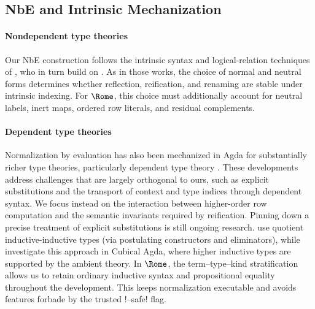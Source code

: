 \subsection{NbE and Intrinsic Mechanization}

\paragraph{Nondependent type theories}
Our NbE construction follows the intrinsic syntax and logical-relation techniques of , who in turn build on . As in those works, the choice of normal and neutral forms determines whether reflection, reification, and renaming are stable under intrinsic indexing. For $\Rome$, this choice must additionally account for neutral labels, inert maps, ordered row literals, and residual complements.

\paragraph{Dependent type theories}
Normalization by evaluation has also been mechanized in Agda for substantially richer type theories, particularly dependent type theory \citep{Abel13,AbelC14,AbelAHPMSS19}. These developments address challenges that are largely orthogonal to ours, such as explicit substitutions and the transport of context and type indices through dependent syntax. We focus instead on the interaction between higher-order row computation and the semantic invariants required by reification. Pinning down a precise treatment of explicit substitutions is still ongoing research.  use quotient inductive-inductive types (via postulating constructors and eliminators), while  investigate this approach in Cubical Agda, where higher inductive types are supported by the ambient theory. In $\Rome$, the term--type--kind stratification allows us to retain ordinary inductive syntax and propositional equality throughout the development. This keeps normalization executable and avoids features forbade by the trusted !--safe! flag.






 

